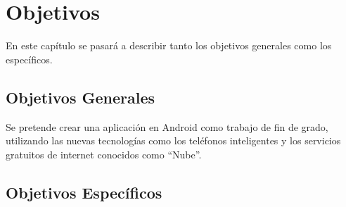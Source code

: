 %
%
%
%

\cleardoublepage
\chapter{Objetivos}
\label{chap:objetives}

	En este capítulo se pasará a describir tanto los objetivos generales como los específicos.
	
	\section{Objetivos Generales}
		Se pretende crear una aplicación en Android como trabajo de fin de grado, utilizando las nuevas tecnologías como los teléfonos inteligentes y los servicios gratuitos de internet conocidos como ``Nube''\cite{57:nube:online}.
	
	\section{Objetivos Específicos}
		
